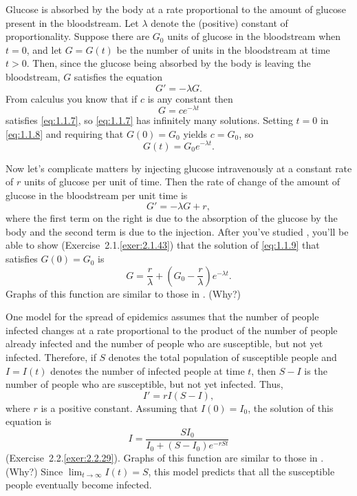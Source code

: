 
Glucose is absorbed by
the body at a rate proportional to the amount of glucose present in
the bloodstream. Let $\lambda$ denote the (positive) constant of
proportionality. Suppose   there are $G_0$ units of glucose in
the bloodstream when $t=0$, and let $G=G(t)$ be the number of units in
the bloodstream at time $t>0$. Then, since the glucose being absorbed
by the body is leaving the bloodstream, $G$ satisfies the equation
\begin{equation} \label{eq:1.1.7}
G'=-\lambda G.
\end{equation}
From  calculus you know that if $c$ is any constant then
\begin{equation} \label{eq:1.1.8}
G=ce^{-\lambda t}
\end{equation}
satisfies \eqref{eq:1.1.7}, so \eqref{eq:1.1.7} has infinitely
many solutions.
 Setting $t=0$ in \eqref{eq:1.1.8} and requiring that
$G(0)=G_0$ yields $c=G_0$, so
\[
G(t)=G_0e^{-\lambda t}.
\]

Now let's complicate matters by injecting glucose intravenously
at a constant rate of $r$ units of glucose per unit of time.
Then the rate of change of the amount of glucose  in the bloodstream
per unit time is
\begin{equation} \label{eq:1.1.9}
G'=-\lambda G+r,
\end{equation}
where the first term on the right is due to the absorption of the
glucose by the body and the second term is due to the injection.
After you've studied ,
you'll be able to show (Exercise~2.1.\ref{exer:2.1.43}) that the solution
of \eqref{eq:1.1.9} that satisfies $G(0)=G_0$ is
\[
G=\frac{r}{\lambda}+\left(G_0-\frac{r}{\lambda}\right)e^{-\lambda t}.
\]
Graphs of  this function are similar to those in
.
(Why?)


One model for the spread of epidemics assumes that the number of
people infected changes at a rate proportional to the product of the
number of people already infected and the number of people who are
susceptible, but not yet infected. Therefore, if $S$ denotes the
total population of susceptible people and $I=I(t)$ denotes the
number
of infected people at time $t$, then $S-I$ is the number of people
who are susceptible, but not yet infected. Thus,
\[
I'=rI(S-I),
\]
where $r$ is a positive constant. Assuming that $I(0)=I_0$,
the solution of this equation is
\[
I=\frac{SI_0}{I_0+(S-I_0)e^{-rSt}}
\]
({Exercise~2.2.\ref{exer:2.2.29}}).
 Graphs of this function are similar to those in
.
(Why?)
Since $\lim_{t\to\infty}I(t)=S$, this model predicts that all the
susceptible people eventually become infected.


